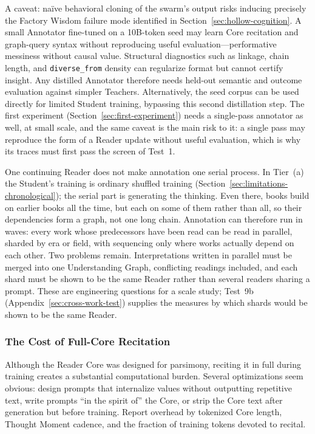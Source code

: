 \documentclass[11pt]{article}
\begin{document}
A caveat: na\"ive behavioral cloning of the swarm's output risks inducing precisely the Factory Wisdom failure mode identified in Section~\ref{sec:hollow-cognition}. A small Annotator fine-tuned on a 10B-token seed may learn Core recitation and graph-query syntax without reproducing useful evaluation---performative messiness without causal value. Structural diagnostics such as linkage, chain length, and \texttt{diverse\_from} density can regularize format but cannot certify insight. Any distilled Annotator therefore needs held-out semantic and outcome evaluation against simpler Teachers. Alternatively, the seed corpus can be used directly for limited Student training, bypassing this second distillation step. The first experiment (Section~\ref{sec:first-experiment}) needs a single-pass annotator as well, at small scale, and the same caveat is the main risk to it: a single pass may reproduce the form of a Reader update without useful evaluation, which is why its traces must first pass the screen of Test~1.

One continuing Reader does not make annotation one serial process. In Tier~(a)
the Student's training is ordinary shuffled training
(Section~\ref{sec:limitations-chronological}); the serial part is generating the
thinking. Even there, books build on earlier books all the time, but each on
some of them rather than all, so their dependencies form a graph, not one long
chain. Annotation can therefore run in waves: every work whose predecessors have
been read can be read in parallel, sharded by era or field, with sequencing only
where works actually depend on each other. Two problems remain. Interpretations
written in parallel must be merged into one Understanding Graph, conflicting
readings included, and each shard must be shown to be the same Reader rather
than several readers sharing a prompt. These are engineering questions for a
scale study; Test~9b (Appendix~\ref{sec:cross-work-test}) supplies the measures
by which shards would be shown to be the same Reader.

\subsubsection{The Cost of Full-Core Recitation}

Although the Reader Core was designed for parsimony, reciting it in full during training creates a substantial computational burden. Several optimizations seem obvious: design prompts that internalize values without outputting repetitive text, write prompts ``in the spirit of'' the Core, or strip the Core text after generation but before training. Report overhead by tokenized Core length, Thought Moment cadence, and the fraction of training tokens devoted to recital.
\end{document}
